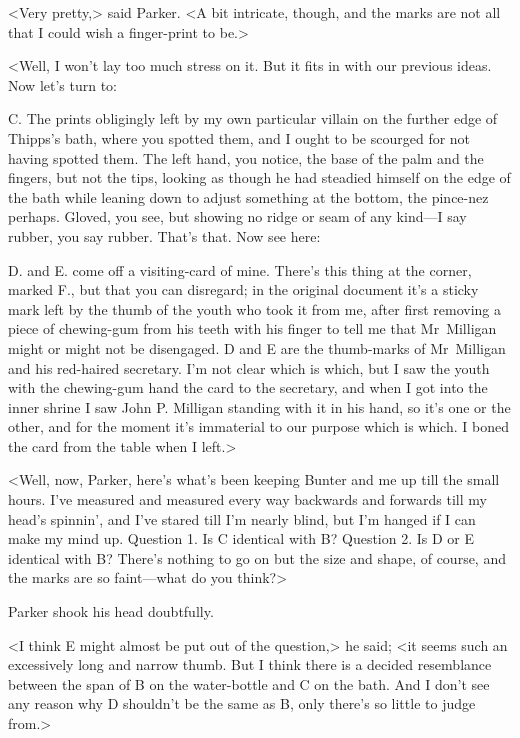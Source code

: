 <Very pretty,> said Parker. <A bit intricate, though, and the marks are not all that I could wish a finger-print to be.>

<Well, I won't lay too much stress on it. But it fits in with our previous ideas. Now let's turn to:

{\large C.} The prints obligingly left by my own particular villain on the further edge of Thipps's bath, where you spotted them, and I ought to be scourged for not having spotted them. The left hand, you notice, the base of the palm and the fingers, but not the tips, looking as though he had steadied himself on the edge of the bath while leaning down to adjust something at the bottom, the pince-nez perhaps. Gloved, you see, but showing no ridge or seam of any kind—I say rubber, you say rubber. That's that. Now see here:

{\large D.} and {\large E.} come off a visiting-card of mine. There's this thing at the corner, marked {\large F.}, but that you can disregard; in the original document it's a sticky mark left by the thumb of the youth who took it from me, after first removing a piece of chewing-gum from his teeth with his finger to tell me that Mr~Milligan might or might not be disengaged. D and E are the thumb-marks of Mr~Milligan and his red-haired secretary. I'm not clear which is which, but I saw the youth with the chewing-gum hand the card to the secretary, and when I got into the inner shrine I saw John P\@. Milligan standing with it in his hand, so it's one or the other, and for the moment it's immaterial to our purpose which is which. I boned the card from the table when I left.>

<Well, now, Parker, here's what's been keeping Bunter and me up till the small hours. I've measured and measured every way backwards and forwards till my head's spinnin', and I've stared till I'm nearly blind, but I'm hanged if I can make my mind up. Question 1. Is {\large C} identical with {\large B}? Question 2. Is {\large D} or {\large E} identical with {\large B}? There's nothing to go on but the size and shape, of course, and the marks are so faint—what do you think?>

Parker shook his head doubtfully.

<I think {\large E} might almost be put out of the question,> he said; <it seems such an excessively long and narrow thumb. But I think there is a decided resemblance between the span of {\large B} on the water-bottle and {\large C} on the bath. And I don't see any reason why {\large D} shouldn't be the same as {\large B}, only there's so little to judge from.>

